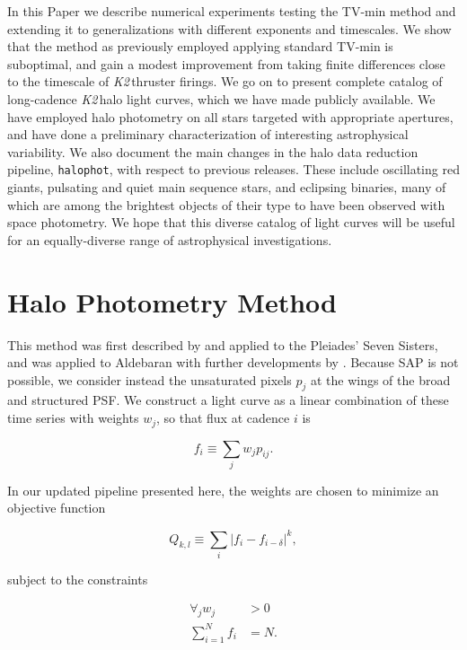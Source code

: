 \documentclass[modern]{aastex62}
\newcommand\ktwo{\emph{K2}\,}
\begin{document}
In this Paper we describe numerical experiments testing the TV-min method and extending it to generalizations with different exponents and timescales. We show that the method as previously employed applying standard TV-min is suboptimal, and gain a modest improvement from taking finite differences close to the timescale of \ktwo thruster firings. 
We go on to present complete catalog of long-cadence \ktwo halo light curves, which we have made publicly available. We have employed halo photometry on all stars targeted with appropriate apertures, and have done a preliminary characterization of interesting astrophysical variability. We also document the main changes in the halo data reduction pipeline, \texttt{halophot}, with respect to previous releases. These include oscillating red giants, pulsating and quiet main sequence stars, and eclipsing binaries, many of which are among the brightest objects of their type to have been observed with space photometry. We hope that this diverse catalog of light curves will be useful for an equally-diverse range of astrophysical investigations. 

\section{Halo Photometry Method}
\label{method}


This method was first described by \citet{White2017} and applied to the Pleiades' Seven Sisters, and was applied to Aldebaran with further developments by \citet{Farr2018}. Because SAP is not possible, we consider instead the unsaturated pixels $p_j$ at the wings of the broad and structured PSF. We construct a light curve as a linear combination of these time series with weights $w_j$, so that flux at cadence $i$ is 

\begin{equation}
    f_i \equiv \sum_j {w_j p_{ij}}.
\end{equation}

\noindent In our updated pipeline presented here, the weights are chosen to minimize an objective function

\begin{equation}
    Q_{k,l} \equiv {\sum_i{|f_i - f_{i-\delta}|^k}},
\end{equation}

\noindent subject to the constraints 

\begin{align}
\forall_j w_j &> 0\\
\sum_{i=1}^{N} f_i  &= N.
\end{align}
\end{document}
